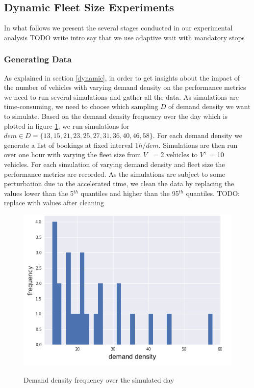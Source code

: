 \documentclass[12pt,a4paper]{article}
\begin{document}
\subsection{Dynamic Fleet Size Experiments}
In what follows we present the several stages conducted in our experimental analysis TODO write intro 
say that we use adaptive wait with mandatory stops
\subsubsection{Generating Data}\label{data}
As explained in section \ref{dynamic}, in order to get insights about the impact of the number of vehicles with varying demand density on the performance metrics we need to run several simulations and gather all the data. As simulations are time-consuming, we need to choose which sampling $D$ of demand density we want to simulate. Based on the demand density frequency over the day which is plotted in figure \ref{demfreq}, we run simulations for $dem \in D = \{13, 15, 21, 23, 25, 27, 31, 36, 40, 46, 58\}$. For each demand density we generate a list of bookings at fixed interval $1h / dem$. Simulations are then run over one hour with varying the fleet size from $V^{-}=$2 vehicles to $V^{+}=$10 vehicles. For each simulation of varying demand density and fleet size the performance metrics are recorded. As the simulations are subject to some perturbation due to the accelerated time, we clean the data by replacing the values lower than the 5$^{th}$ quantiles and higher than the 95$^{th}$ quantiles. 
TODO: replace with values after cleaning

\begin{figure} 
  \centering
  \caption{Demand density frequency over the simulated day}
\includegraphics[scale=0.6]{./images/demand_freq.png}
\label{demfreq}
\end{figure}
\end{document}
